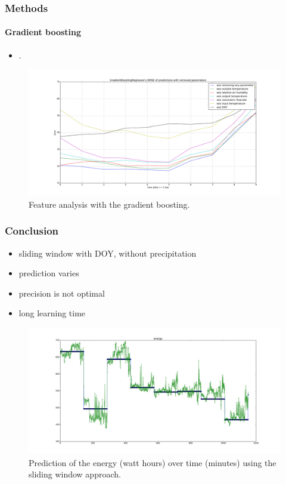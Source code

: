\documentclass{beamer}
\begin{document}
\begin{frame}
\frametitle{Methods}
\framesubtitle{Gradient boosting}

\begin{itemize}
\item .
\end{itemize}


\begin{figure}[H]
  \includegraphics[width=0.8 \linewidth]{img/GradientBoostingRegressor_day_error_without_some_params.png}
  \caption{Feature analysis with the gradient boosting.}
  \label{fig:gradientboost}
\end{figure}

\end{frame}

\begin{frame}
\frametitle{Conclusion}


\begin{itemize}
\item sliding window with DOY, without precipitation
\item prediction varies
\item precision is not optimal
\item long learning time
\end{itemize}

\begin{figure}[H]
  \includegraphics[width=0.8\linewidth]{img/predict-energy--0p890.png}
  \caption{Prediction of the energy (watt hours) over time (minutes) using the sliding window approach.}
  \label{fig:Prediction}
\end{figure}

\end{frame}
\end{document}
